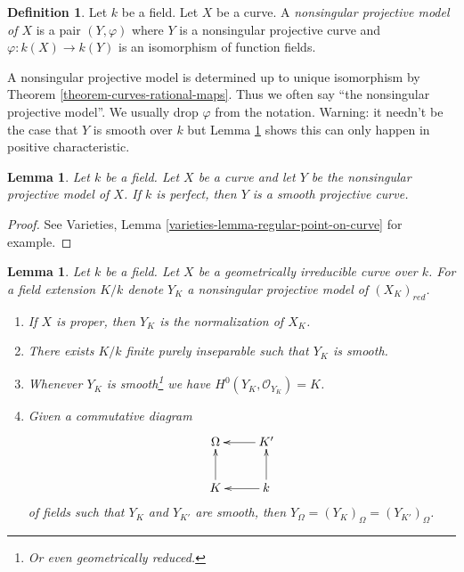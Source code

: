 \documentclass{stacks-project}
\theoremstyle{plain}
\newtheorem{lemma}[subsection]{Lemma}
\theoremstyle{definition}
\newtheorem{definition}[subsection]{Definition}
\theoremstyle{remark}
\numberwithin{equation}{subsection}
\begin{document}
\begin{definition}
\label{definition-normal-projective-model}
Let $k$ be a field. Let $X$ be a curve.
A {\it nonsingular projective model of $X$}
is a pair $(Y, \varphi)$ where $Y$ is a nonsingular projective
curve and $\varphi : k(X) \to k(Y)$ is an isomorphism
of function fields.
\end{definition}

\noindent
A nonsingular projective model is determined up to unique
isomorphism by Theorem \ref{theorem-curves-rational-maps}.
Thus we often say ``the nonsingular projective model''.
We usually drop $\varphi$ from the notation.
Warning: it needn't be the case that $Y$ is smooth over $k$
but Lemma \ref{lemma-nonsingular-model-smooth}
shows this can only happen in positive characteristic.

\begin{lemma}
\label{lemma-nonsingular-model-smooth}
Let $k$ be a field. Let $X$ be a curve and let $Y$ be the nonsingular
projective model of $X$. If $k$ is perfect, then $Y$ is a smooth
projective curve.
\end{lemma}

\begin{proof}
See Varieties, Lemma \ref{varieties-lemma-regular-point-on-curve}
for example.
\end{proof}

\begin{lemma}
\label{lemma-smooth-models}
Let $k$ be a field. Let $X$ be a geometrically irreducible curve over $k$.
For a field extension $K/k$ denote $Y_K$ a nonsingular projective model
of $(X_K)_{red}$.
\begin{enumerate}
\item If $X$ is proper, then $Y_K$ is the normalization of $X_K$.
\item There exists $K/k$ finite purely inseparable such that $Y_K$ is smooth.
\item Whenever $Y_K$ is smooth\footnote{Or even geometrically reduced.}
we have $H^0(Y_K, \mathcal{O}_{Y_K}) = K$.
\item Given a commutative diagram
$$
\xymatrix{
\Omega & K' \ar[l] \\
K \ar[u] & k \ar[l] \ar[u]
}
$$
of fields such that $Y_K$ and $Y_{K'}$ are smooth, then
$Y_\Omega = (Y_K)_\Omega = (Y_{K'})_\Omega$.
\end{enumerate}
\end{lemma}
\end{document}
